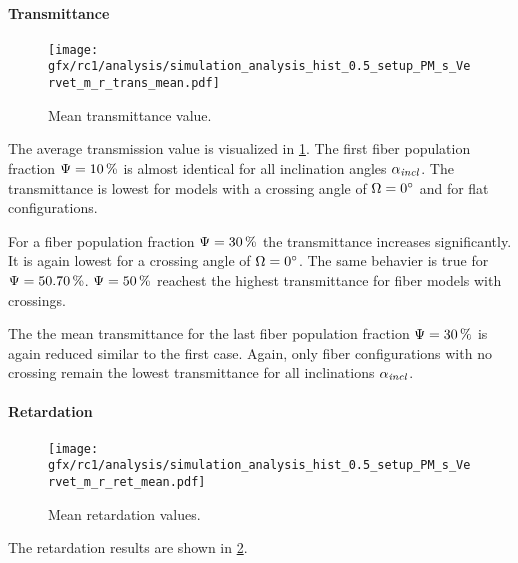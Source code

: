 \paragraph{Transmittance}
% 
\begin{figure}[!p]
\centering
\texttt{[image: gfx/rc1/analysis/simulation\_analysis\_hist\_0.5\_setup\_PM\_s\_Vervet\_m\_r\_trans\_mean.pdf]}
\caption{Mean transmittance value. }
\label{fig:sim_ana_trans}
\end{figure}
% 
The average transmission value is visualized in \cref{fig:sim_ana_trans}.
The first fiber population fraction $\textnormal{$\Psi$}=\SI{10}{\percent}$ is almost identical for all inclination angles $\textnormal{$\alpha_{\mathit{incl}}$}$.
The transmittance is lowest for models with a crossing angle of $\textnormal{$\Omega$} = \SI{0}{\degree}$ and for flat configurations.
\par
%
For a fiber population fraction $\textnormal{$\Psi$}=\SI{30}{\percent}$ the transmittance increases significantly.
It is again lowest for a crossing angle of $\textnormal{$\Omega$}=\SI{0}{\degree}$.
The same behavier is true for $\modelPsi=\SIlist{50,70}{\percent}$.
$\textnormal{$\Psi$}=\SI{50}{\percent}$ reachest the highest transmittance for fiber models with crossings.
\par
% 
The the mean transmittance for the last fiber population fraction $\textnormal{$\Psi$}=\SI{30}{\percent}$ is again reduced similar to the first case.
Again, only fiber configurations with no crossing remain the lowest transmittance for all inclinations $\textnormal{$\alpha_{\mathit{incl}}$}$.
%
% 
% 
\paragraph{Retardation}
% 
\begin{figure}[!p]
\centering
\texttt{[image: gfx/rc1/analysis/simulation\_analysis\_hist\_0.5\_setup\_PM\_s\_Vervet\_m\_r\_ret\_mean.pdf]}
\caption{Mean retardation values. }
\label{fig:sim_ana_ret}
\end{figure}
% 
The retardation results are shown in \cref{fig:sim_ana_ret}.

